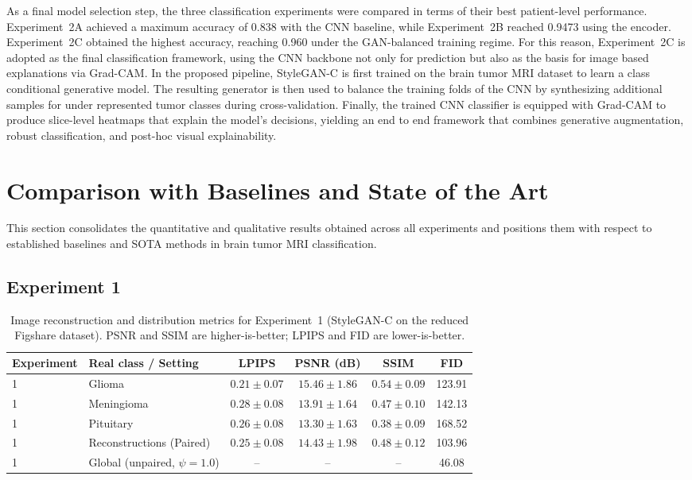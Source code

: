 As a final model selection step, the three classification experiments were compared in terms of their best patient-level performance. Experiment~2A achieved a maximum accuracy of 0.838 with the CNN baseline, while Experiment~2B reached 0.9473 using the encoder. Experiment~2C obtained the highest accuracy, reaching 0.960 under the GAN-balanced training regime. For this reason, Experiment~2C is adopted as the final classification framework, using the CNN backbone not only for prediction but also as the basis for image based explanations via Grad-CAM. In the proposed pipeline, StyleGAN-C is first trained on the brain tumor MRI dataset to learn a class conditional generative model. The resulting generator is then used to balance the training folds of the CNN by synthesizing additional samples for under represented tumor classes during cross-validation. Finally, the trained CNN classifier is equipped with Grad-CAM to produce slice-level heatmaps that explain the model's decisions, yielding an end to end framework that combines generative augmentation, robust classification, and post-hoc visual explainability.


\section{Comparison with Baselines and State of the Art}


This section consolidates the quantitative and qualitative results obtained across all experiments and positions them with respect to established baselines and SOTA methods in brain tumor MRI classification.


\subsection{Experiment 1}

\begin{table}[H]
\centering
\small
\caption{Image reconstruction and distribution metrics for Experiment~1 (StyleGAN-C on the reduced Figshare dataset). PSNR and SSIM are higher-is-better; LPIPS and FID are lower-is-better.}
\label{tab:image_metrics_lpips_psnr_ssim_fid}
\begin{tabular}{llcccc}
\toprule
Experiment & Real class / Setting & LPIPS & PSNR (dB) & SSIM & FID \\
\midrule
1 & Glioma     & $0.21 \pm 0.07$ & $15.46 \pm 1.86$ & $0.54 \pm 0.09$ & 123.91 \\
1 & Meningioma & $0.28 \pm 0.08$ & $13.91 \pm 1.64$ & $0.47 \pm 0.10$ & 142.13 \\
1 & Pituitary  & $0.26 \pm 0.08$ & $13.30 \pm 1.63$ & $0.38 \pm 0.09$ & 168.52 \\
\midrule
1 & Reconstructions (Paired) 
              & $0.25 \pm 0.08$ & $14.43 \pm 1.98$ & $0.48 \pm 0.12$ & 103.96 \\
1 & Global (unpaired, $\psi = 1.0$) 
              & --                & --               & --                & 46.08 \\
\bottomrule
\end{tabular}
\end{table}


